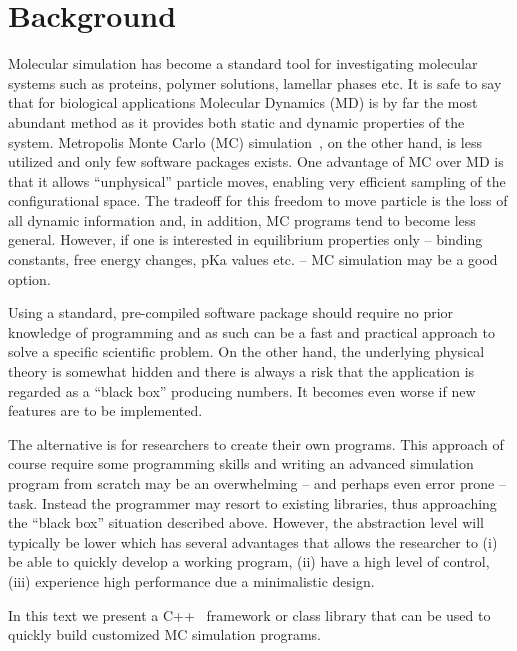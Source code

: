 \documentclass[10pt]{bmc_article}
\newenvironment{bmcformat}{\fussy\setboolean{publ}{true}}{\fussy}
\begin{document}
\begin{bmcformat}
\section*{Background}
Molecular simulation has become a standard tool for investigating molecular systems such as proteins, polymer solutions, lamellar phases etc.
It is safe to say that for biological applications Molecular Dynamics (MD) is by far the most abundant method as it provides both static and dynamic properties of the system.
Metropolis Monte Carlo (MC) simulation~\cite{metropolis:53}, on the other hand, is less utilized and only few software packages exists\cite{Kamberaj:2001fk,carlsson:01,Jie-Hu:2006lr}. One advantage of MC over MD is that it allows ``unphysical'' particle moves, enabling very efficient sampling of the configurational space\cite{frenkel}. The tradeoff for this freedom to move particle is the loss of all dynamic information and, in addition, MC programs tend to become less general.
However, if one is interested in equilibrium properties only -- binding constants, free energy changes, pKa values etc. -- MC simulation may be a good option.

Using a standard, pre-compiled software package should require no prior knowledge of programming and as such can be a fast and practical approach to solve a specific scientific problem. On the other hand, the underlying physical theory is somewhat hidden and there is always a risk that the application is regarded as a ``black box'' producing numbers. It becomes even worse if new features are to be implemented.

The alternative is for researchers to create their own programs. This approach of course require some programming skills and writing an advanced simulation program from scratch may be an overwhelming -- and perhaps even error prone -- task.
Instead the programmer may resort to existing libraries, thus approaching the ``black box'' situation described above. However, the abstraction level will typically be lower which has several advantages that allows the researcher to
(i) be able to quickly develop a working program,
(ii) have a high level of control,
(iii) experience high performance due a minimalistic design.

In this text we present a C++~\cite{stroustrup:97} framework or class library that can be used to quickly build customized MC simulation programs.




\end{bmcformat}
\end{document}
